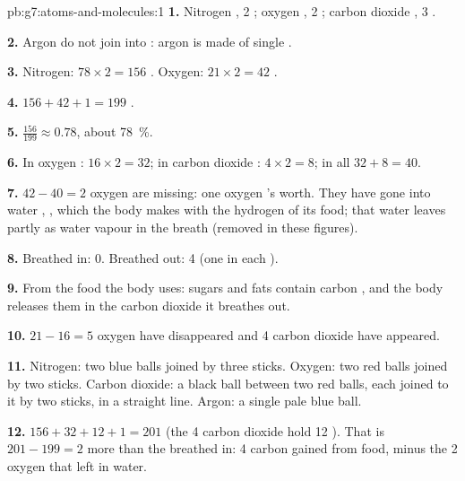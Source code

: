 \begin{solution}{pb:g7:atoms-and-molecules:1}
\textbf{1.} Nitrogen , 2 ; oxygen , 2 ; carbon
dioxide , 3 .

\textbf{2.} Argon  do not join into : argon is made of
single .

\textbf{3.} Nitrogen: $78 \times 2 = 156$ . Oxygen: $21\times 2 =
42$ .

\textbf{4.} $156 + 42 + 1 = 199$ .

\textbf{5.} $\frac{156}{199} \approx 0.78$, about \qty{78}{\percent}.

\textbf{6.} In oxygen : $16\times 2 = 32$; in carbon dioxide
: $4 \times 2 = 8$; in all $32 + 8 = 40$.

\textbf{7.} $42 - 40 = 2$ oxygen  are missing: one oxygen 's
worth. They have gone into water , , which the body makes
with the hydrogen of its food; that water leaves partly as water vapour in
the breath (removed in these figures).

\textbf{8.} Breathed in: 0. Breathed out: 4 (one in each ).

\textbf{9.} From the food the body uses: sugars and fats contain carbon
, and the body releases them in the carbon dioxide it breathes out.

\textbf{10.} $21 - 16 = 5$ oxygen  have disappeared and 4 carbon
dioxide  have appeared.

\textbf{11.} Nitrogen: two blue balls joined by three sticks. Oxygen: two
red balls joined by two sticks. Carbon dioxide: a black ball between two
red balls, each joined to it by two sticks, in a straight line. Argon: a
single pale blue ball.

\textbf{12.} $156 + 32 + 12 + 1 = 201$  (the 4 carbon dioxide
 hold 12 ). That is $201 - 199 = 2$  more than the 
breathed in: 4 carbon  gained from food, minus the 2 oxygen  that
left in water.
\end{solution}
